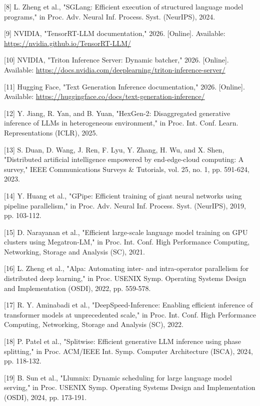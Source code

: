 \documentclass[a4paper,twocolumn,10pt]{ctexart}
\begin{document}
[8] L. Zheng et al., "SGLang: Efficient execution of structured language model programs," in Proc. Adv. Neural Inf. Process. Syst. (NeurIPS), 2024.


[9] NVIDIA, "TensorRT-LLM documentation," 2026. [Online]. Available: \href{https://nvidia.github.io/TensorRT-LLM/}{https://nvidia.github.io/TensorRT-LLM/}


[10] NVIDIA, "Triton Inference Server: Dynamic batcher," 2026. [Online]. Available: \href{https://docs.nvidia.com/deeplearning/triton-inference-server/}{https://docs.nvidia.com/deeplearning/triton-inference-server/}


[11] Hugging Face, "Text Generation Inference documentation," 2026. [Online]. Available: \href{https://huggingface.co/docs/text-generation-inference/}{https://huggingface.co/docs/text-generation-inference/}


[12] Y. Jiang, R. Yan, and B. Yuan, "HexGen-2: Disaggregated generative inference of LLMs in heterogeneous environment," in Proc. Int. Conf. Learn. Representations (ICLR), 2025.


[13] S. Duan, D. Wang, J. Ren, F. Lyu, Y. Zhang, H. Wu, and X. Shen, "Distributed artificial intelligence empowered by end-edge-cloud computing: A survey," IEEE Communications Surveys \& Tutorials, vol. 25, no. 1, pp. 591-624, 2023.


[14] Y. Huang et al., "GPipe: Efficient training of giant neural networks using pipeline parallelism," in Proc. Adv. Neural Inf. Process. Syst. (NeurIPS), 2019, pp. 103-112.


[15] D. Narayanan et al., "Efficient large-scale language model training on GPU clusters using Megatron-LM," in Proc. Int. Conf. High Performance Computing, Networking, Storage and Analysis (SC), 2021.


[16] L. Zheng et al., "Alpa: Automating inter- and intra-operator parallelism for distributed deep learning," in Proc. USENIX Symp. Operating Systems Design and Implementation (OSDI), 2022, pp. 559-578.


[17] R. Y. Aminabadi et al., "DeepSpeed-Inference: Enabling efficient inference of transformer models at unprecedented scale," in Proc. Int. Conf. High Performance Computing, Networking, Storage and Analysis (SC), 2022.


[18] P. Patel et al., "Splitwise: Efficient generative LLM inference using phase splitting," in Proc. ACM/IEEE Int. Symp. Computer Architecture (ISCA), 2024, pp. 118-132.


[19] B. Sun et al., "Llumnix: Dynamic scheduling for large language model serving," in Proc. USENIX Symp. Operating Systems Design and Implementation (OSDI), 2024, pp. 173-191.
\end{document}
